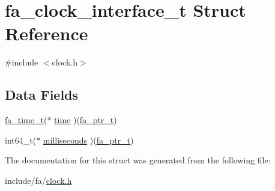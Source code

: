 \hypertarget{structfa__clock__interface__t}{\section{fa\-\_\-clock\-\_\-interface\-\_\-t Struct Reference}
\label{structfa__clock__interface__t}
}


{\ttfamily \#include $<$clock.\-h$>$}

\subsection*{Data Fields}
\begin{DoxyCompactItemize}
\item 
\hyperlink{group___fa_time_ga227cc693f20b4873fed11028bcade184}{fa\-\_\-time\-\_\-t}($\ast$ \hyperlink{group___fa_gae50ab41164d46abc894493742002a9c1}{time} )(\hyperlink{group___fa_ga915ddeae99ad7568b273d2b876425197}{fa\-\_\-ptr\-\_\-t})
\item 
int64\-\_\-t($\ast$ \hyperlink{group___fa_ga8656c8678fe42872fce0430526e1f9ef}{milliseconds} )(\hyperlink{group___fa_ga915ddeae99ad7568b273d2b876425197}{fa\-\_\-ptr\-\_\-t})
\end{DoxyCompactItemize}


The documentation for this struct was generated from the following file\-:\begin{DoxyCompactItemize}
\item 
include/fa/\hyperlink{clock_8h}{clock.\-h}\end{DoxyCompactItemize}
